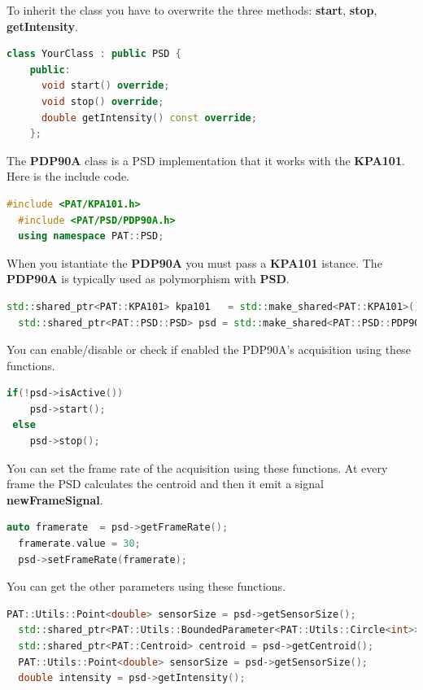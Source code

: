 To inherit the class you have to overwrite the three methods:
\textbf{start}, \textbf{stop}, \textbf{getIntensity}.

\begin{lstlisting}[language=c++, gobble=2]
  class YourClass : public PSD {
    public:
      void start() override;
      void stop() override;
      double getIntensity() const override;
    };    
\end{lstlisting}


The \textbf{PDP90A} class is a PSD implementation that it works with the
\textbf{KPA101}. Here is the include code.

\begin{lstlisting}[language=c++, gobble=2]
  #include <PAT/KPA101.h>
  #include <PAT/PSD/PDP90A.h>
  using namespace PAT::PSD;  
\end{lstlisting}

When you istantiate the \textbf{PDP90A} you must pass a \textbf{KPA101}
istance. The \textbf{PDP90A} is typically used as polymorphism with
\textbf{PSD}.

\begin{lstlisting}[language=c++, gobble=2]
  std::shared_ptr<PAT::KPA101> kpa101   = std::make_shared<PAT::KPA101>();
  std::shared_ptr<PAT::PSD::PSD> psd = std::make_shared<PAT::PSD::PDP90A>(kpa101);
\end{lstlisting}

You can enable/disable or check if enabled the PDP90A's acquisition
using these functions.

\begin{lstlisting}[language=c++, gobble=2]
  if(!psd->isActive())
    psd->start();
 else
    psd->stop();
\end{lstlisting}

You can set the frame rate of the acquisition using these functions. At
every frame the PSD calculates the centroid and then it emit a signal
\textbf{newFrameSignal}.

\begin{lstlisting}[language=c++, gobble=2]
  auto framerate  = psd->getFrameRate();
  framerate.value = 30;
  psd->setFrameRate(framerate);
\end{lstlisting}

You can get the other parameters using these functions.

\begin{lstlisting}[language=c++, gobble=2]
  PAT::Utils::Point<double> sensorSize = psd->getSensorSize();
  std::shared_ptr<PAT::Utils::BoundedParameter<PAT::Utils::Circle<int>>> target = psd->getTarget();
  std::shared_ptr<PAT::Centroid> centroid = psd->getCentroid();
  PAT::Utils::Point<double> sensorSize = psd->getSensorSize();
  double intensity = psd->getIntensity();
\end{lstlisting}

